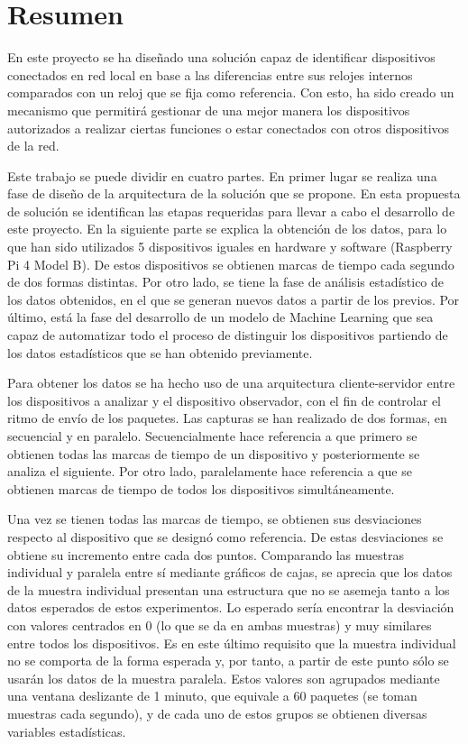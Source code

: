 
\chapter*{Resumen}
 \label{chap:resumen}

En este proyecto se ha diseñado una solución capaz de identificar dispositivos conectados en red local en base a las diferencias entre sus relojes internos comparados con un reloj que se fija como referencia. Con esto, ha sido creado un mecanismo que permitirá gestionar de una mejor manera los dispositivos autorizados a realizar ciertas funciones o estar conectados con otros dispositivos de la red.

Este trabajo se puede dividir en cuatro partes. En primer lugar se realiza una fase de diseño de la arquitectura de la solución que se propone. En esta propuesta de solución se identifican las etapas requeridas para llevar a cabo el desarrollo de este proyecto. En la siguiente parte se explica la obtención de los datos, para lo que han sido utilizados 5 dispositivos iguales en hardware y software (Raspberry Pi 4 Model B). De estos dispositivos se obtienen marcas de tiempo cada segundo de dos formas distintas. Por otro lado, se tiene la fase de análisis estadístico de los datos obtenidos, en el que se generan nuevos datos a partir de los previos. Por último, está la fase del desarrollo de un modelo de Machine Learning que sea capaz de automatizar todo el proceso de distinguir los dispositivos partiendo de los datos estadísticos que se han obtenido previamente.

Para obtener los datos se ha hecho uso de una arquitectura cliente-servidor entre los dispositivos a analizar y el dispositivo observador, con el fin de controlar el ritmo de envío de los paquetes. Las capturas se han realizado de dos formas, en secuencial y en paralelo. Secuencialmente hace referencia a que primero se obtienen todas las marcas de tiempo de un dispositivo y posteriormente se analiza el siguiente. Por otro lado, paralelamente hace referencia a que se obtienen marcas de tiempo de todos los dispositivos simultáneamente.

Una vez se tienen todas las marcas de tiempo, se obtienen sus desviaciones respecto al dispositivo que se designó como referencia. De estas desviaciones se obtiene su incremento entre cada dos puntos. Comparando las muestras individual y paralela entre sí mediante gráficos de cajas, se aprecia que los datos de la muestra individual presentan una estructura que no se asemeja tanto a los datos esperados de estos experimentos. Lo esperado sería encontrar la desviación con valores centrados en 0 (lo que se da en ambas muestras) y muy similares entre todos los dispositivos. Es en este último requisito que la muestra individual no se comporta de la forma esperada y, por tanto, a partir de este punto sólo se usarán los datos de la muestra paralela. Estos valores son agrupados mediante una ventana deslizante de 1 minuto, que equivale a 60 paquetes (se toman muestras cada segundo), y de cada uno de estos grupos se obtienen diversas variables estadísticas.

